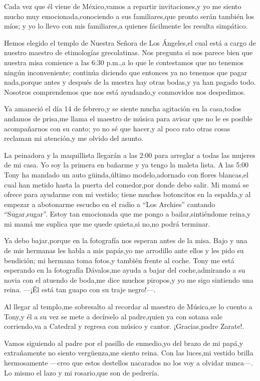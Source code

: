 \documentclass[letterpaper,12pt]{book}
\begin{document}
Cada vez que él viene de México,vamos a repartir invitaciones,y yo me siento mucho muy emocionada,conociendo a sus familiares,que pronto serán también los míos; y yo lo llevo con mis familiares,a quienes fácilmente les resulta simpático.

Hemos elegido el templo de Nuestra Señora de Los Ángeles,el cual está a cargo de nuestro maestro de etimologías grecolatinas. Nos pregunta si nos parece bien que nuestra misa comience a las 6:30 p.m.,a lo que le contestamos que no tenemos ningún inconveniente; continúa diciendo que entonces ya no tenemos que pagar nada,porque antes y después de la nuestra hay otras bodas,y ya han pagado todo. Nosotros comprendemos que nos está ayudando,y conmovidos nos despedimos.

Ya amaneció el día 14 de febrero,y se siente mucha agitación en la casa,todos andamos de prisa,me llama el maestro de música para avisar que no le es posible acompañarnos con su canto; yo no sé que hacer,y al poco rato otras cosas reclaman mi atención,y me olvido del asunto.

La peinadora y la maquillista llegarán a las 2:00 para arreglar a todas las mujeres de mi casa. Yo soy la primera en bañarme y ya tengo la maleta lista.  A las 5:00 Tony ha mandado un auto güinda,último modelo,adornado con flores blancas,el cual han metido hasta la puerta del comedor,por donde debo salir.  Mi mamá se ofrece para ayudarme con mi vestido; tiene muchos botoncitos en la espalda,y al empezar a abotonarme escucho en el radio a ``Los Archies'' cantando ``Sugar,sugar''. Estoy tan emocionada que me pongo a bailar,sintiéndome reina,y mi mamá me suplica que me quede quieta,si no,no podrá terminar.

Ya debo bajar,porque en la fotografía nos esperan antes de la misa. Bajo y una de mis hermanas les habla a mis papás,yo me arrodillo ante ellos y les pido su bendición; mi hermana toma fotos,y también frente al coche. Tony me está esperando en la fotografía Dávalos,me ayuda a bajar del coche,admirando a su novia con el atuendo de boda,me dice muchos piropos,y yo me sigo sintiendo una reina. ---¡Él está tan guapo con su traje negro!---.

Al llegar al templo,me sobresalto al recordar al maestro de Música,se lo cuento a Tony,y él a su vez se mete a decírselo al padre,quien ya con sotana sale corriendo,va a Catedral y regresa con músico y cantor. ¡Gracias,padre Zarate!.

Vamos siguiendo al padre por el pasillo de enmedio,yo del brazo de mi papá,y extrañamente no siento vergüenza,me siento reina. Con las luces,mi vestido brilla hermosamente ---creo que estos destellos nacarados no los voy a olvidar nunca---. Lo mismo el lazo y mi rosario,que son de pedrería.
\end{document}
